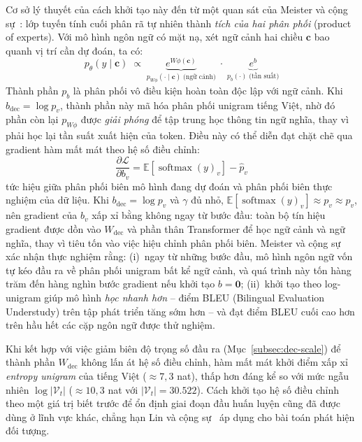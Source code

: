 Cơ sở lý thuyết của cách khởi tạo này đến từ một quan sát của Meister và cộng
sự~\cite{meister2022naturalbias}: lớp tuyến tính cuối phân rã tự nhiên thành \textit{tích của
hai phân phối} (product of experts). Với mô hình ngôn ngữ có mặt nạ, xét ngữ cảnh hai
chiều $\mathbf{c}$ bao quanh vị trí cần dự đoán, ta có:
\begin{equation}
  \label{eq:poe}
  p_\theta(y \mid \mathbf{c})
  \;\propto\;
  \underbrace{e^{W\phi(\mathbf{c})}}_{p_{W\phi}(\cdot\mid \mathbf{c})\;\text{(ngữ cảnh)}}
  \;\cdot\;
  \underbrace{e^{b}}_{p_b(\cdot)\;\text{(tần suất)}}
\end{equation}
Thành phần $p_b$ là phân phối vô điều kiện hoàn toàn độc lập với ngữ cảnh. Khi $b_{\mathrm{dec}}
= \log p_v$, thành phần này mã hóa phân phối unigram tiếng Việt, nhờ đó phần
còn lại $p_{W\phi}$ được \textit{giải phóng} để tập trung học thông tin ngữ nghĩa, thay vì phải học lại
tần suất xuất hiện của token. Điều này có thể diễn đạt chặt chẽ qua gradient hàm mất mát theo hệ số điều chỉnh:
\begin{equation}
  \label{eq:bias-grad}
  \frac{\partial\mathcal{L}}{\partial b_v}
  = \mathbb{E}[\operatorname{softmax}(y)_v] - \hat{p}_v
\end{equation}
tức hiệu giữa phân phối biên mô hình đang dự đoán và phân phối biên thực nghiệm của dữ liệu.
Khi $b_{\mathrm{dec}} = \log p_v$ và $\gamma$ đủ nhỏ, $\mathbb{E}[\operatorname{softmax}(y)_v] \approx p_v
\approx \hat{p}_v$, nên gradient của $b_v$ xấp xỉ bằng không ngay từ bước đầu: toàn bộ tín hiệu
gradient được dồn vào $W_{\mathrm{dec}}$ và phần thân Transformer để học ngữ cảnh và ngữ
nghĩa, thay vì tiêu tốn vào việc hiệu chỉnh phân phối biên.
Meister và cộng sự xác nhận thực nghiệm rằng: (i)~ngay từ những bước đầu, mô
hình ngôn ngữ vốn tự kéo đầu ra về phân phối unigram bất kể ngữ cảnh, và quá trình này tốn
hàng trăm đến hàng nghìn bước gradient nếu khởi tạo $b = \mathbf{0}$; (ii)~khởi tạo theo
log-unigram giúp mô hình \textit{học nhanh hơn} -- điểm BLEU (Bilingual Evaluation Understudy)
trên tập phát triển tăng sớm hơn -- và đạt điểm BLEU cuối cao hơn trên hầu hết
các cặp ngôn ngữ được thử nghiệm.

Khi kết hợp với việc giảm biên độ trọng số đầu ra (Mục~\ref{subsec:dec-scale}) để thành phần
$W_{\mathrm{dec}}$ không lấn át hệ số điều chỉnh, hàm mất mát khởi điểm xấp xỉ \textit{entropy unigram}
của tiếng Việt (${\approx}7{,}3$ nat), thấp hơn đáng kể so với mức ngẫu nhiên
$\log|\mathcal{V}_t|$ (${\approx}10{,}3$ nat với $|\mathcal{V}_t| = 30.522$). Cách khởi tạo hệ số điều chỉnh theo một giá trị biết trước để ổn định giai đoạn đầu huấn luyện cũng đã được dùng ở lĩnh vực khác, chẳng hạn Lin và cộng sự~\cite{lin2017focal} áp dụng cho bài toán phát hiện đối tượng.

